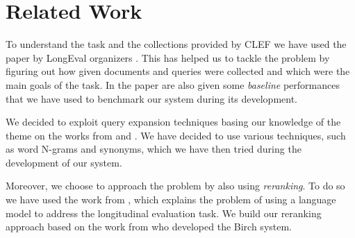 \section{Related Work}
\label{sec:related}

To understand the task and the collections provided by \ac{CLEF} we have used the paper by LongEval organizers \citet{galuvsvcakova2023longeval}. This has helped us to tackle the problem by figuring out how given documents and queries were collected and which were the main goals of the task. In the paper are also given some \emph{baseline} performances that we have used to benchmark our system during its development. 

We decided to exploit query expansion techniques basing our knowledge of the theme on the works from \citet{carpineto2012survey} and \citet{azad2019query}. We have decided to use various techniques, such as word N-grams and synonyms, which we have then tried during the development of our system.

Moreover, we choose to approach the problem by also using \emph{reranking}. To do so we have used the work from \citet{alkhalifa2022building}, which explains the problem of using a language model to address the longitudinal evaluation task. We build our reranking approach based on the work from \citet{Birch} who developed the Birch system.